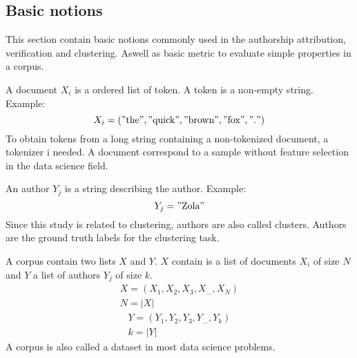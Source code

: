 \subsection{Basic notions \label{sec:basic_notions}}

This section contain basic notions commonly used in the authorship attribution, verification and clustering.
Aswell as basic metric to evaluate simple properties in a corpus.

\begin{definition}[Document]
  A document $X_i$ is a ordered list of token. A token is a non-empty string. Example:
  \begin{equation}
    X_i = ("\text{the}", "\text{quick}", "\text{brown}", "\text{fox}", "\text{.}")
  \end{equation}
  To obtain tokens from a long string containing a non-tokenized document, a tokenizer i needed.
  A document correspond to a sample without feature selection in the data science field.
\end{definition}

\begin{definition}[Author]
  An author $Y_j$ is a string describing the author. Example:
  \begin{equation}
    Y_j = "\text{Zola}"
  \end{equation}
  Since this study is related to clustering, authors are also called clusters.
  Authors are the ground truth labels for the clustering task.
\end{definition}

\begin{definition}[Corpus]
  A corpus contain two lists $X$ and $Y$.
  $X$ contain is a list of documents $X_i$ of size $N$ and $Y$ a list of authors $Y_j$ of size $k$.
  \begin{gather}
    X = (X_1, X_2, X_3, X_{...}, X_N) \\
    N = |X|
  \end{gather}
  \begin{gather}
    Y = (Y_1, Y_2, Y_3, Y_{...}, Y_k) \\
    k = |Y|
  \end{gather}
  A corpus is also called a dataset in most data science problems.
\end{definition}


